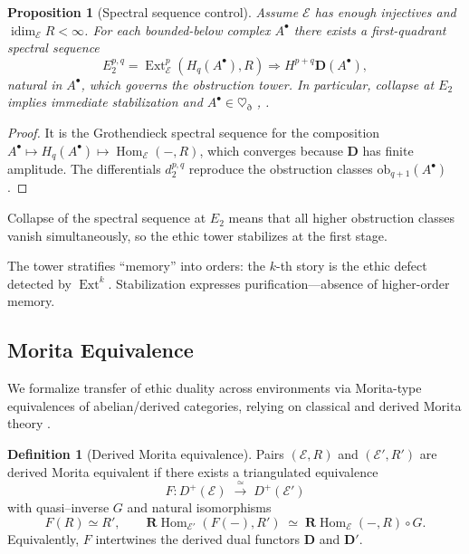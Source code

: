 \documentclass[12pt]{article}
\newcommand{\ob}{\mathrm{ob}}
\newcommand{\E}{\mathcal{E}}
\newcommand{\Hom}{\operatorname{Hom}}
\newcommand{\Ext}{\operatorname{Ext}}
\newcommand{\RHom}{\mathbf{R}\!\operatorname{Hom}}
\theoremstyle{plain}
\newtheorem{proposition}[theorem]{Proposition}
\theoremstyle{definition}
\newtheorem{definition}[theorem]{Definition}
\theoremstyle{remark}
\numberwithin{equation}{section}
\begin{document}
\begin{proposition}[Spectral sequence control]\label{prop:ESS}
Assume $\E$ has enough injectives and $\operatorname{idim}_\E R<\infty$.
For each bounded-below complex $A^\bullet$ there exists a
first-quadrant spectral sequence
\[
E_2^{p,q}=\Ext^p_\E(H_q(A^\bullet),R)
\Rightarrow H^{p+q}\mathbf D(A^\bullet),
\]
natural in \(A^\bullet\), which governs the obstruction tower. In particular, collapse at \(E_2\) implies immediate stabilization and \(A^\bullet\in \heartsuit_{\eth}\) \cite{Weibel1994}, \cite{Neeman2001}.
\end{proposition}

\begin{proof}
It is the Grothendieck spectral sequence for the composition
$A^\bullet\mapsto H_q(A^\bullet)\mapsto\Hom_\E(-,R)$,
which converges because $\mathbf D$ has finite amplitude.
The differentials $d_2^{p,q}$ reproduce the obstruction classes
$\ob_{q+1}(A^\bullet)$.
\end{proof}

Collapse of the spectral sequence at $E_2$ means that
all higher obstruction classes vanish simultaneously,
so the ethic tower stabilizes at the first stage.

The tower stratifies ``memory'' into orders: the \(k\)-th story is the ethic defect detected by \(\Ext^{k}\). Stabilization expresses purification—absence of higher-order memory.

\subsection{Morita Equivalence}\label{sec:morita}

\noindent We formalize transfer of ethic duality across environments via Morita-type equivalences of abelian/derived categories, relying on classical and derived Morita theory \cite{Rickard1989,Keller1994,Toen2007,LurieHA}.

\begin{definition}[Derived Morita equivalence]\label{def:EME}
Pairs $(\E,R)$ and $(\E',R')$ are derived Morita equivalent
if there exists a triangulated equivalence
\[
F: D^+(\E)\;\xrightarrow{\;\simeq\;}\;D^+(\E')
\]
with quasi–inverse $G$ and natural isomorphisms
\[
F(R)\simeq R',
\qquad
\RHom_{\E'}(F(-),R')\;\simeq\;
\RHom_{\E}(-,R)\circ G.
\]
Equivalently, $F$ intertwines the derived dual functors
$\mathbf D$ and $\mathbf D'$.
\end{definition}
\end{document}
